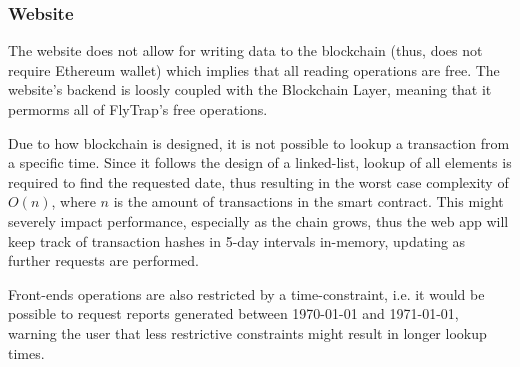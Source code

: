 \subsubsection{Website}
The website does not allow for writing data to the blockchain (thus, does not require Ethereum wallet) which implies that all reading operations are free. The website's backend is loosly coupled with the Blockchain Layer, meaning that it permorms all of FlyTrap's free operations.

Due to how blockchain is designed, it is not possible to lookup a transaction from a specific time. Since it follows the design of a linked-list, lookup of all elements is required to find the requested date, thus resulting in the worst case complexity of $O(n)$, where $n$ is the amount of transactions in the smart contract. This might severely impact performance, especially as the chain grows, thus the web app will keep track of transaction hashes in 5-day intervals in-memory, updating as further requests are performed.

Front-ends operations are also restricted by a time-constraint, i.e. it would be possible to request reports generated between 1970-01-01 and 1971-01-01, warning the user that less restrictive constraints might result in longer lookup times.
